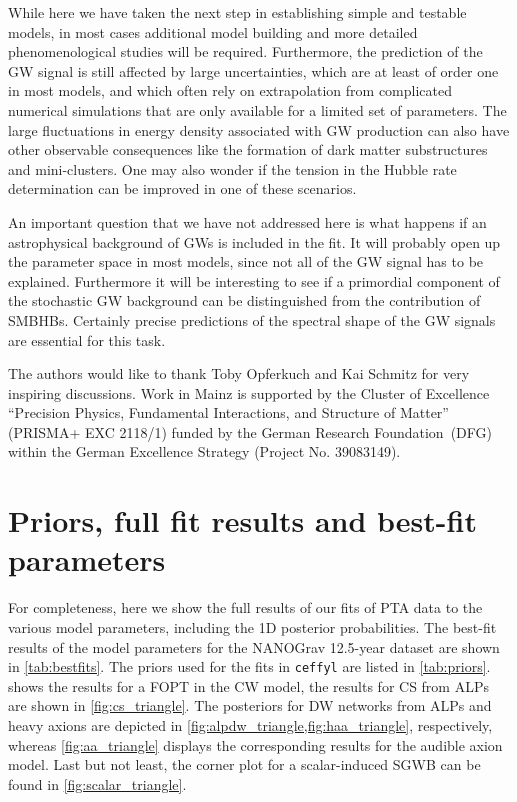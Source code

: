 \documentclass{article}
\begin{document}
While here we have taken the next step in establishing simple and testable models, in most cases additional model building and more detailed phenomenological studies will be required. Furthermore, the prediction of the GW signal is still affected by large uncertainties, which are at least of order one in most models, and which often rely on extrapolation from complicated numerical simulations that are only available for a limited set of parameters. The large fluctuations in energy density associated with GW production can also have other observable consequences like the formation of dark matter substructures and mini-clusters. One may also wonder if the tension in the Hubble rate determination can be improved in one of these scenarios. 

An important question that we have not addressed here is what happens if an astrophysical background of GWs is included in the fit. It will probably open up the parameter space in most models, since not all of the GW signal has to be explained. Furthermore it will be interesting to see if a primordial component of the stochastic GW background can be distinguished from the contribution of SMBHBs. Certainly precise predictions of the spectral shape of the GW signals are essential for this task. 


\acknowledgments

The authors would like to thank Toby Opferkuch and Kai Schmitz for very inspiring discussions. 
Work in Mainz is supported by the Cluster of Excellence “Precision Physics, Fundamental Interactions, and Structure of Matter” (PRISMA+ EXC 2118/1) funded by the German Research Foundation~(DFG) within the German Excellence Strategy (Project No. 39083149).

\appendix

\section{Priors, full fit results and best-fit parameters}
\label{app:triangle_plots}
%
For completeness, here we show the full results of our fits of PTA data to the various model parameters, including the 1D posterior probabilities.
The best-fit results of the model parameters for the NANOGrav 12.5-year dataset are shown in \cref{tab:bestfits}.
The priors used for the fits in \texttt{ceffyl} are listed in \cref{tab:priors}.
 shows the results for a FOPT in the CW model, the results for CS from ALPs are shown in \cref{fig:cs_triangle}. The posteriors for DW networks from ALPs and heavy axions are depicted in \cref{fig:alpdw_triangle,fig:haa_triangle}, respectively, whereas \cref{fig:aa_triangle} displays the corresponding results for the audible axion model.
Last but not least, the corner plot for a scalar-induced SGWB can be found in \cref{fig:scalar_triangle}.
\end{document}
